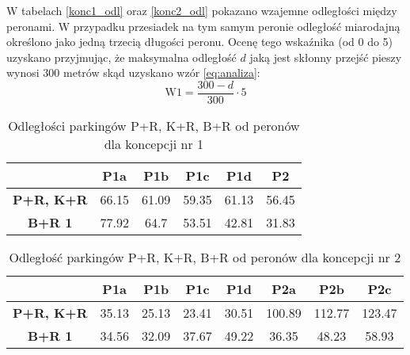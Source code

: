 \documentclass[twoside,12pt]{article}
\begin{document}
     W tabelach \ref{konc1_odl} oraz \ref{konc2_odl} pokazano wzajemne odległości między peronami. W przypadku przesiadek na tym samym peronie odległość miarodajną określono jako jedną trzecią długości peronu. Ocenę tego wskaźnika (od 0 do 5) uzyskano przyjmując, że maksymalna odległość $d$ jaką jest skłonny przejść pieszy wynosi 300 metrów skąd uzyskano wzór \ref{eq:analiza}:
     \begin{equation}\label{eq:analiza}
     \text{W1} = \frac{300-d}{300}\cdot 5
     \end{equation}
     
     \begin{table}[H]
       \centering
       \caption{Odległości parkingów P+R, K+R, B+R od peronów dla koncepcji nr 1}
     \begin{tabular}{|c|c|c|c|c|c|}
     \toprule
                & \textbf{P1a} & \textbf{P1b} & \textbf{P1c} & \textbf{P1d} & \textbf{P2} \\
     \midrule
     \textbf{P+R, K+R} & 66.15      & 61.09      & 59.35      & 61.13      & 56.45 \\
     \midrule
     \textbf{B+R 1} & 77.92      & 64.7       & 53.51      & 42.81      & 31.83 \\
     \bottomrule
     \end{tabular}%

         
       \label{konc1_park}
     \end{table}%
     
     \begin{table}[H]
       \centering
       \caption{Odległość parkingów P+R, K+R, B+R od peronów dla koncepcji nr 2}
     \begin{tabular}{|c|c|c|c|c|c|c|c|}
     \toprule
                & \textbf{P1a} & \textbf{P1b} & \textbf{P1c} & \textbf{P1d} & \textbf{P2a} & \textbf{P2b} & \textbf{P2c} \\
     \midrule
     \textbf{P+R, K+R} & 35.13      & 25.13      & 23.41      & 30.51      & 100.89     & 112.77     & 123.47 \\
     \midrule
     \textbf{B+R 1} & 34.56      & 32.09      & 37.67      & 49.22      & 36.35      & 48.23      & 58.93 \\
     \bottomrule
     \end{tabular}%

         
       \label{konc2_park}
     \end{table}%
     
\end{document}
